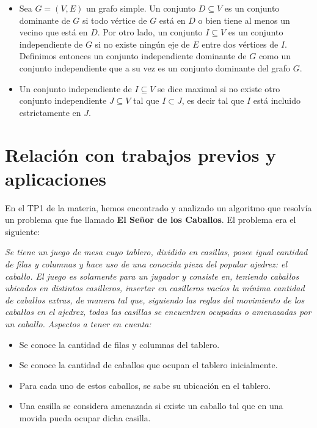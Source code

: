 \documentclass[a4paper]{article}
\begin{document}
\begin{itemize}

\item Sea $G = (V, E)$ un grafo simple. Un conjunto $D \subseteq V$ es un conjunto dominante de $G$ si todo vértice de $G$ está en $D$ o bien tiene al menos un vecino que está en $D$. Por otro lado, un conjunto $I \subseteq V$ es un conjunto independiente de $G$ si no existe ningún eje de $E$ entre dos vértices de $I$. Definimos entonces un conjunto independiente dominante de $G$ como un conjunto independiente que a su vez es un conjunto dominante del grafo $G$.

\item Un conjunto independiente de $I \subseteq V$ se dice maximal si no existe otro conjunto independiente $J \subseteq V$ tal que $I \subset J$, es decir tal que $I$ está incluido estrictamente en $J$. %

\end{itemize}

\vspace*{0.6cm}

\section{Relación con trabajos previos y aplicaciones}

\vspace*{0.3cm}

En el TP1 de la materia, hemos encontrado y analizado un algoritmo que resolvía un problema que fue llamado {\bf El Señor de los Caballos}. El problema era el siguiente:

\vspace*{0.1cm}

{\it Se tiene un juego de mesa cuyo tablero, dividido en casillas, posee igual cantidad de filas y columnas y hace uso de una conocida pieza del popular ajedrez: el caballo. El juego es solamente para un jugador y consiste en, teniendo caballos ubicados en distintos casilleros, insertar en casilleros vacíos la mínima cantidad de caballos extras, de manera tal que, siguiendo las reglas del movimiento de los caballos en el ajedrez, todas las casillas se encuentren ocupadas o amenazadas por un caballo.
Aspectos a tener en cuenta:

\begin{itemize}
   \item Se conoce la cantidad de filas y columnas del tablero.
   \item Se conoce la cantidad de caballos que ocupan el tablero inicialmente.
   \item Para cada uno de estos caballos, se sabe su ubicación en el tablero.
   \item Una casilla se considera amenazada si existe un caballo tal que en una movida pueda ocupar dicha casilla.
\end{itemize}
}
\end{document}
